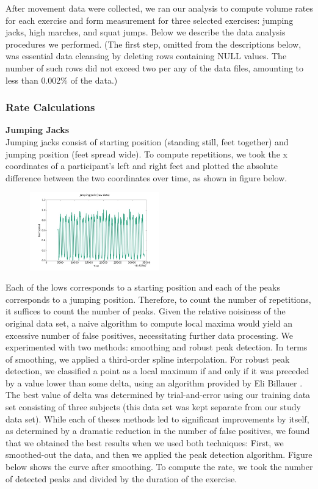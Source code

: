 
After movement data were collected, we ran our analysis to compute volume rates for each exercise and form measurement for three selected exercises: jumping jacks, high marches, and squat jumps. Below we describe the data analysis procedures we performed. (The first step, omitted from the descriptions below, was essential data cleansing by deleting rows containing NULL values. The number of such rows did not exceed two per any of the data files, amounting to less than 0.002\% of the data.)

\subsubsection{Rate Calculations}
\textbf{Jumping Jacks}  \\
Jumping jacks consist of starting position (standing still, feet together) and jumping position (feet spread wide). To compute repetitions, we took the x coordinates of a participant's left and right feet and plotted the absolute difference between the two coordinates over time, as shown in figure below.
\begin{figure} [htp]
	\includegraphics[width=0.5\textwidth]{images/jj_raw}
\end{figure}
Each of the lows corresponds to a starting position and each of the peaks corresponds to a jumping position. Therefore, to count the number of repetitions, it suffices to count the number of peaks. Given the relative noisiness of the original data set, a naive algorithm to compute local maxima would yield an excessive number of false positives, necessitating further data processing. We experimented with two methods: smoothing and robust peak detection. In terms of smoothing, we applied a third-order spline interpolation. For robust peak detection, we classified a point as a local maximum if and only if it was preceded by a value lower than some delta, using an algorithm provided by Eli Billauer \cite{Billauer}. The best value of delta was determined by trial-and-error using our training data set consisting of three subjects (this data set was kept separate from our study data set). While each of theses methods led to significant improvements by itself, as determined by a dramatic reduction in the number of false positives, we found that we obtained the best results when we used both techniques: First, we smoothed-out the data, and then we applied the peak detection algorithm. Figure below shows the curve after smoothing. To compute the rate, we took the number of detected peaks and divided by the duration of the exercise.
